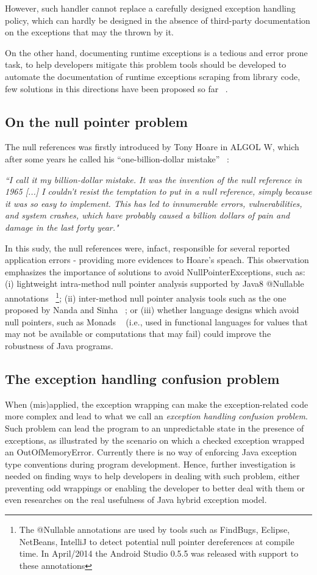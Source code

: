 \documentclass[conference]{IEEEtran}
\begin{document}
However, such handler cannot replace a carefully designed exception 
handling policy, which can hardly be designed in the absence of 
third-party documentation on the exceptions that
may the thrown by it.

On the other hand, documenting runtime exceptions is a tedious and error prone task, to help developers
mitigate this problem tools should be developed to automate the documentation of runtime exceptions
scraping from library code, few solutions in this directions have been proposed so far ~\cite{van2005combining}. 

\subsection{On the null pointer problem}
The null references was firstly introduced by Tony Hoare in ALGOL W, which after some years he called his “one-billion-dollar mistake” ~\cite{hoare}:

\emph{``I call it my billion-dollar mistake. It was the invention of the null reference in 1965 [...] I couldn’t resist the temptation to put 
in a null reference, simply because it was so easy to implement. This has led to innumerable errors, vulnerabilities, and system 
crashes, which have probably caused a billion dollars of pain and damage in the last forty year."}

In this sudy, the null references were, infact, responsible for several reported application errors - providing more evidences to Hoare's speach.
This observation emphasizes the importance of solutions to avoid NullPointerExceptions, such as:
(i) lightweight intra-method null pointer analysis supported by Java8 @Nullable annotations ~\footnote{The @Nullable annotations are used by tools such as FindBugs, Eclipse, NetBeans, IntelliJ to detect potential 
null pointer dereferences at compile time. In April/2014 the Android Studio 0.5.5 was 
released with support to these annotations};
(ii) inter-method null pointer analysis tools such as the one proposed by Nanda and Sinha ~\cite{nanda2009accurate};
or (iii) whether language designs which avoid null pointers, such 
as Monads ~\cite{Walde95} (i.e., used in functional languages for values that may not be available 
or computations that may fail) could improve the robustness of Java programs. 


\subsection{The exception handling confusion problem}
When (mis)applied, the exception wrapping can make the exception-related code
 more complex and lead to what we call an \emph{exception handling confusion problem}.
Such problem can lead the program to an unpredictable state in the presence of exceptions,
as illustrated by the scenario on which a checked exception wrapped an OutOfMemoryError. 
Currently there is no way of enforcing Java exception type conventions during program development.
Hence, further investigation is needed on finding ways to help developers in dealing with such
 problem, either preventing odd wrappings or enabling the developer to better deal with them or even
researches on the real usefulness of Java hybrid exception model. 
\end{document}

